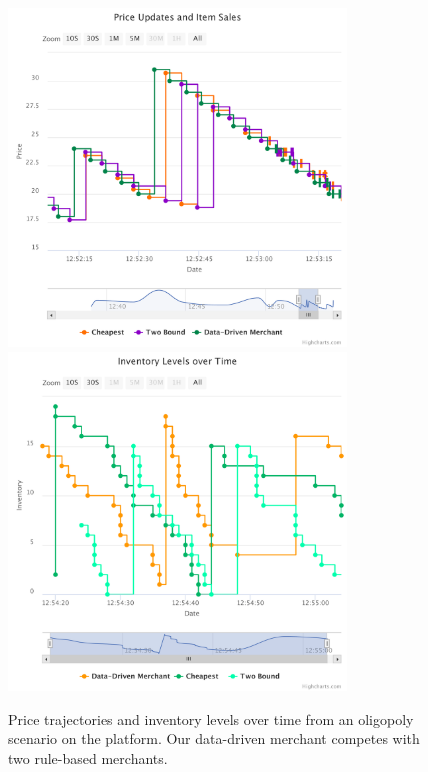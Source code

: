 \begin{figure}[p]
	\centering
	\includegraphics[width=0.8\textwidth]{figures/competition_prices.pdf}
	\includegraphics[width=0.8\textwidth]{figures/competition_inventory.pdf}
	\caption{Price trajectories and inventory levels over time from an oligopoly scenario on the \pricewars platform. Our data-driven merchant competes with two rule-based merchants.}
	\label{fig:competition}
\end{figure}

